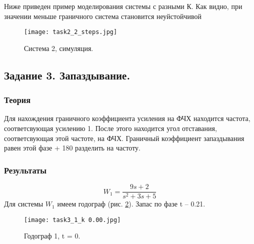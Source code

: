 \documentclass[16pt]{article}
\begin{document}
Ниже приведен пример моделирования системы с разными К. Как видно, при значении меньше граничного система становится неуйстойчивой

\begin{figure}[h!]
    \centering
    \texttt{[image: task2\_2\_steps.jpg]}
    \caption{Система 2, симуляция.}
    \label{fig:fig29}
\end{figure}

\newpage











































\subsection{Задание 3. Запаздывание.}
\subsubsection{Теория}
Для нахождения граничного коэффициента усиления на ФЧХ находится частота, соответсвующая усилению 1. После этого находится угол отставания, соответсвующая этой частоте, на ФЧХ. Граничный коэффициент запаздывания равен этой фазе + 180 разделить на частоту.


\subsubsection{Результаты}
\[W_1 = \frac{9s+2}{s^2+3s+5}\]
Для системы \(W_1\) имеем годограф (рис. \ref*{fig:fig20}). Запас по фазе t -- 0.21.
\begin{figure}[h!]
    \centering
    \texttt{[image: task3\_1\_k 0.00.jpg]}
    \caption{Годограф 1, t = 0.}
    \label{fig:fig20}
\end{figure}
\end{document}
